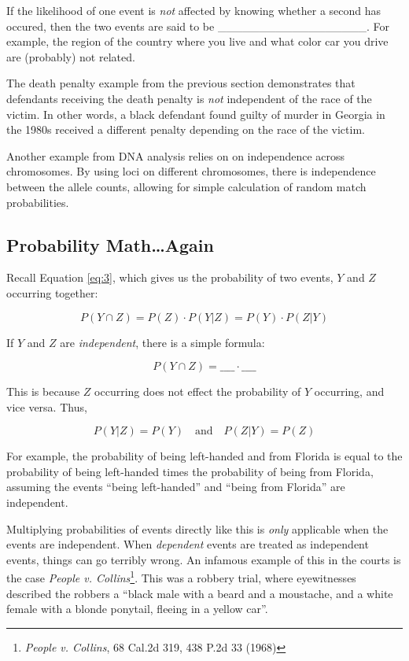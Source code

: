 \documentclass[]{book}
\let\rmarkdownfootnote\footnote%
\def\footnote{\protect\rmarkdownfootnote}
\theoremstyle{definition}
\theoremstyle{definition}
\theoremstyle{remark}
\begin{document}
If the likelihood of one event is \emph{not} affected by knowing whether
a second has occured, then the two events are said to be
\_\_\_\_\_\_\_\_\_\_\_\_\_\_\_\_\_\_. For example, the region of the
country where you live and what color car you drive are (probably) not
related.

The death penalty example from the previous section demonstrates that
defendants receiving the death penalty is \emph{not} independent of the
race of the victim. In other words, a black defendant found guilty of
murder in Georgia in the 1980s received a different penalty depending on
the race of the victim.

Another example from DNA analysis relies on on independence across
chromosomes. By using loci on different chromosomes, there is
independence between the allele counts, allowing for simple calculation
of random match probabilities.

\subsection{Probability Math\ldots{}Again}\label{probability-mathagain}

Recall Equation \ref{eq:3}, which gives us the probability of two
events, \(Y\) and \(Z\) occurring together:

\[ P(Y \cap Z) = P(Z)\cdot P(Y|Z) = P(Y) \cdot P(Z|Y) \]

If \(Y\) and \(Z\) are \emph{independent}, there is a simple formula:

\[P(Y \cap Z) = \_\_\_\_ \cdot \_\_\_\_\]

This is because \(Z\) occurring does not effect the probability of \(Y\)
occurring, and vice versa. Thus,

\[ P(Y|Z) = P(Y) \quad \text{and} \quad P(Z|Y) = P(Z)\]

For example, the probability of being left-handed and from Florida is
equal to the probability of being left-handed times the probability of
being from Florida, assuming the events ``being left-handed'' and
``being from Florida'' are independent.

Multiplying probabilities of events directly like this is \emph{only}
applicable when the events are independent. When \emph{dependent} events
are treated as independent events, things can go terribly wrong. An
infamous example of this in the courts is the case
\textit{People v. Collins}\footnote{\emph{People v. Collins}, 68 Cal.2d
  319, 438 P.2d 33 (1968)}. This was a robbery trial, where eyewitnesses
described the robbers a ``black male with a beard and a moustache, and a
white female with a blonde ponytail, fleeing in a yellow car''.
\end{document}
